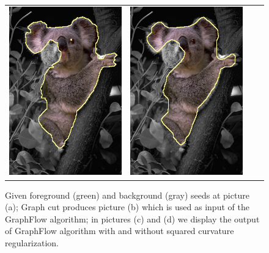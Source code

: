 \begin{figure}
\begin{tabular}{cccc}
 	\includegraphics[scale=0.25]{figures/chapter8/segmentation/coala/k-0.0/corrected-seg.png} &  	
 	\includegraphics[scale=0.25]{figures/chapter8/segmentation/coala/k-0.5/corrected-seg.png}
\end{tabular}	
\caption{ Given foreground (green) and background (gray) seeds at picture (a); Graph cut produces picture (b) which is used as input of the GraphFlow algorithm; in pictures (c) and (d) we display the output of GraphFlow algorithm with and without squared curvature regularization. }
\label{ch8:fig:segmentation}
\end{figure}

